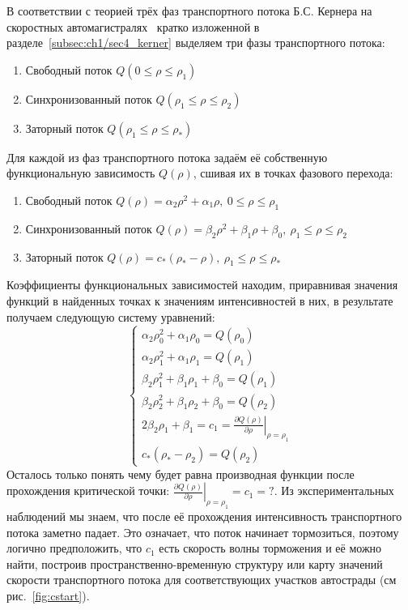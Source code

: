 В соответствии с теорией трёх фаз транспортного потока Б.С. Кернера на скоростных автомагистралях~\cite{kerner2009introduction} кратко изложенной в разделе~\cref{subsec:ch1/sec4_kerner} выделяем три фазы транспортного потока:
\begin{enumerate}
  \item Свободный поток \(Q(0\leq\rho\leq\rho_1)\)
  \item Синхронизованный поток \(Q(\rho_1\leq\rho\leq\rho_2)\)
  \item Заторный поток \(Q(\rho_1\leq\rho\leq\rho_*)\)
\end{enumerate}
Для каждой из фаз транспортного потока задаём её собственную функциональную зависимость \(Q(\rho)\), сшивая их в точках фазового перехода:
\begin{enumerate}
  \item Свободный поток \(Q(\rho) = \alpha_2\rho^2 + \alpha_1\rho,\ 0\leq\rho\leq\rho_1\)
  \item Синхронизованный поток \(Q(\rho) = \beta_2\rho^2 + \beta_1\rho + \beta_0,\ \rho_1\leq\rho\leq\rho_2\)
  \item Заторный поток \(Q(\rho) = c_*(\rho_*-\rho),\ \rho_1\leq\rho\leq\rho_*\)
\end{enumerate}
Коэффициенты функциональных зависимостей находим, приравнивая значения функций в найденных точках к значениям интенсивностей в них, в результате получаем следующую систему уравнений:
\begin{displaymath}\left\{
\begin{array}{llllll}
  \alpha_2\rho_0^2 + \alpha_1\rho_0 = Q(\rho_0)\\
  \alpha_2\rho_1^2 + \alpha_1\rho_1 = Q(\rho_1)\\
  \beta_2\rho_1^2 + \beta_1\rho_1 + \beta_0 = Q(\rho_1)\\
  \beta_2\rho_2^2 + \beta_1\rho_2 + \beta_0 = Q(\rho_2)\\
  2\beta_2\rho_1 + \beta_1 = c_1 = \left.\frac{\partial Q(\rho)}{\partial \rho}\right|_{\rho = \rho_1}\\
  c_*(\rho_*-\rho_2) = Q(\rho_2)
\end{array} \right.
\end{displaymath}
Осталось только понять чему будет равна производная функции после прохождения критической точки: $\left.\frac{\partial Q(\rho)}{\partial \rho}\right|_{\rho = \rho_1} = c_1 = ?$.
Из экспериментальных наблюдений мы знаем, что после её прохождения интенсивность транспортного потока заметно падает. Это означает, что поток начинает тормозиться, поэтому логично предположить, что $c_1$ есть скорость волны торможения и её можно найти, построив пространственно-временную структуру или карту значений скорости транспортного потока для соответствующих участков автострады (см рис.~\ref{fig:cstart}).


